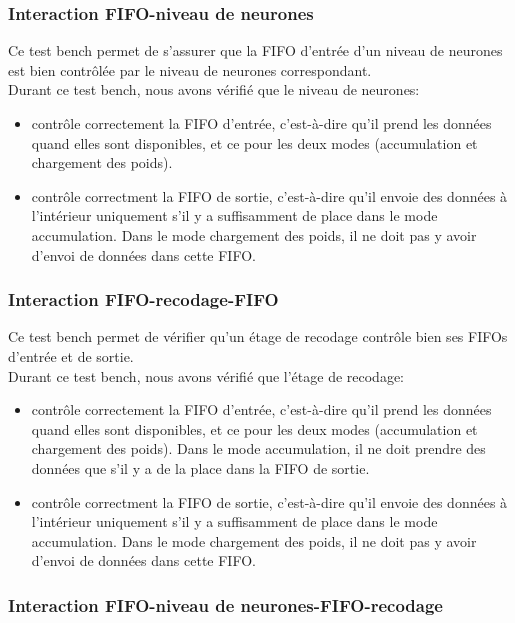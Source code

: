 \subsubsection{Interaction FIFO-niveau de neurones}

Ce test bench permet de s'assurer que la FIFO d'entrée d'un niveau de neurones
est bien contrôlée par le niveau de neurones correspondant.\\

Durant ce test bench, nous avons vérifié que le niveau de neurones:
\begin{itemize}
	\item contrôle correctement la FIFO d'entrée, c'est-à-dire qu'il prend
	les données quand elles sont disponibles, et ce pour les deux modes
	(accumulation et chargement des poids).
	\item contrôle correctment la FIFO de sortie, c'est-à-dire qu'il envoie
	des données à l'intérieur uniquement s'il y a suffisamment de place dans
	le mode accumulation. Dans le mode chargement des poids, il ne doit pas
	y avoir d'envoi de données dans cette FIFO.
\end{itemize}

\subsubsection{Interaction FIFO-recodage-FIFO}

Ce test bench permet de vérifier qu'un étage de recodage contrôle bien ses FIFOs
d'entrée et de sortie.\\

Durant ce test bench, nous avons vérifié que l'étage de recodage:
\begin{itemize}
	\item contrôle correctement la FIFO d'entrée, c'est-à-dire qu'il prend
	les données quand elles sont disponibles, et ce pour les deux modes
	(accumulation et chargement des poids). Dans le mode accumulation, il
	ne doit prendre des données que s'il y a de la place dans la FIFO de
	sortie.
	\item contrôle correctment la FIFO de sortie, c'est-à-dire qu'il envoie
	des données à l'intérieur uniquement s'il y a suffisamment de place dans
	le mode accumulation. Dans le mode chargement des poids, il ne doit pas
	y avoir d'envoi de données dans cette FIFO.
\end{itemize}

\subsubsection{Interaction FIFO-niveau de neurones-FIFO-recodage}

